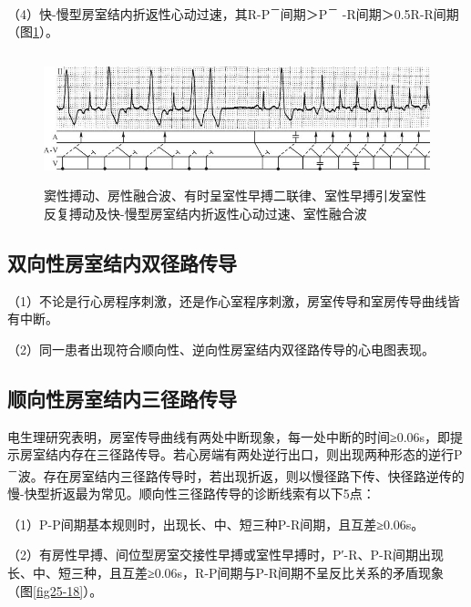 （4）快-慢型房室结内折返性心动过速，其R-P\textsuperscript{－}间期＞P\textsuperscript{－} -R间期＞0.5R-R间期（图\ref{fig25-17}）。

\begin{figure}[!htbp]
 \centering
 \includegraphics[width=5.48958in,height=1.47917in]{./images/Image00428.jpg}
 \captionsetup{justification=centering}
 \caption{窦性搏动、房性融合波、有时呈室性早搏二联律、室性早搏引发室性反复搏动及快-慢型房室结内折返性心动过速、室性融合波}
 \label{fig25-17}
  \end{figure} 

\protect\hypertarget{text00032.htmlux5cux23subid384}{}{}

\subsection{双向性房室结内双径路传导}

（1）不论是行心房程序刺激，还是作心室程序刺激，房室传导和室房传导曲线皆有中断。

（2）同一患者出现符合顺向性、逆向性房室结内双径路传导的心电图表现。

\protect\hypertarget{text00032.htmlux5cux23subid385}{}{}

\subsection{顺向性房室结内三径路传导}

电生理研究表明，房室传导曲线有两处中断现象，每一处中断的时间≥0.06s，即提示房室结内存在三径路传导。若心房端有两处逆行出口，则出现两种形态的逆行P\textsuperscript{－}波。存在房室结内三径路传导时，若出现折返，则以慢径路下传、快径路逆传的慢-快型折返最为常见。顺向性三径路传导的诊断线索有以下5点：

（1）P-P间期基本规则时，出现长、中、短三种P-R间期，且互差≥0.06s。

（2）有房性早搏、间位型房室交接性早搏或室性早搏时，P′-R、P-R间期出现长、中、短三种，且互差≥0.06s，R-P间期与P-R间期不呈反比关系的矛盾现象（图\ref{fig25-18}）。

